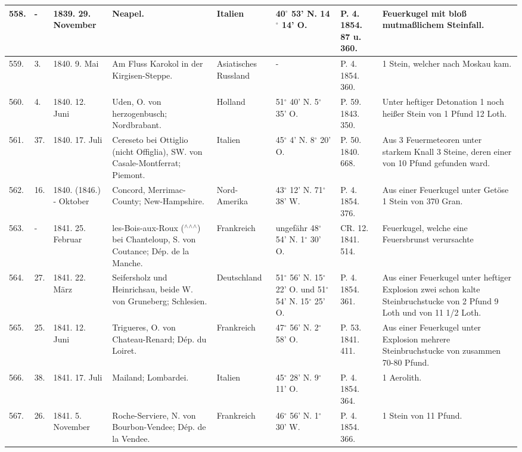 \documentclass[a4paper, 11pt, oneside, polutonikogreek, german]{article}
\begin{document}
\begin{table}[!ht]
\begin{tabular}{|l|l|l|l|l|l|l|l|}
        558. & - & 1839. 29. November & Neapel. & Italien & 40$^\circ$ 53' N. 14$^\circ$ 14' O. & P. 4. 1854. 87 u. 360. & Feuerkugel mit bloß mutmaßlichem Steinfall. \\ \hline
        559. & 3. & 1840. 9. Mai & Am Fluss Karokol in der Kirgisen-Steppe. & Asiatisches Russland & - & P. 4. 1854. 360. & 1 Stein, welcher nach Moskau kam. \\ \hline
        560. & 4. & 1840. 12. Juni & Uden, O. von herzogenbusch; Nordbrabant. & Holland & 51$^\circ$ 40' N. 5$^\circ$ 35' O. & P. 59. 1843. 350. & Unter heftiger Detonation 1 noch heißer Stein von 1 Pfund 12 Loth. \\ \hline
        561. & 37. & 1840. 17. Juli & Cereseto bei Ottiglio (nicht Offiglia), SW. von Casale-Montferrat; Piemont. & Italien & 45$^\circ$ 4' N. 8$^\circ$ 20' O. & P. 50. 1840. 668. & Aus 3 Feuermeteoren unter starkem Knall 3 Steine, deren einer von 10 Pfund gefunden ward. \\ \hline
        562. & 16. & 1840. (1846.) - Oktober & Concord, Merrimac-County; New-Hampshire. & Nord-Amerika & 43$^\circ$ 12' N. 71$^\circ$ 38' W. & P. 4. 1854. 376. & Aus einer Feuerkugel unter Getöse 1 Stein von 370 Gran. \\ \hline
        563. & - & 1841. 25. Februar & les-Bois-aux-Roux ($^\wedge$$^\wedge$$^\wedge$) bei Chanteloup, S. von Coutance; Dép. de la Manche. & Frankreich & ungefähr 48$^\circ$ 54' N. 1$^\circ$ 30' O. & CR. 12. 1841. 514. & Feuerkugel, welche eine Feuersbrunst verursachte \\ \hline
        564. & 27. & 1841. 22. März & Seifersholz und Heinrichsau, beide W. von Gruneberg; Schlesien. & Deutschland & 51$^\circ$ 56' N. 15$^\circ$ 22' O. und 51$^\circ$ 54' N. 15$^\circ$ 25' O. & P. 4. 1854. 361. & Aus einer Feuerkugel unter heftiger Explosion zwei schon kalte Steinbruchstucke von 2 Pfund 9 Loth und von 11 1/2 Loth. \\ \hline
        565. & 25. & 1841. 12. Juni & Trigueres, O. von Chateau-Renard; Dép. du Loiret. & Frankreich & 47$^\circ$ 56' N. 2$^\circ$ 58' O. & P. 53. 1841. 411. & Aus einer Feuerkugel unter Explosion mehrere Steinbruchstucke von zusammen 70-80 Pfund. \\ \hline
        566. & 38. & 1841. 17. Juli & Mailand; Lombardei. & Italien & 45$^\circ$ 28' N. 9$^\circ$ 11' O. & P. 4. 1854. 364. & 1 Aerolith. \\ \hline
        567. & 26. & 1841. 5. November & Roche-Serviere, N. von Bourbon-Vendee; Dép. de la Vendee. & Frankreich & 46$^\circ$ 56' N. 1$^\circ$ 30' W. & P. 4. 1854. 366. & 1 Stein von 11 Pfund. \\ \hline

\end{tabular}
\end{table}
\end{document}

